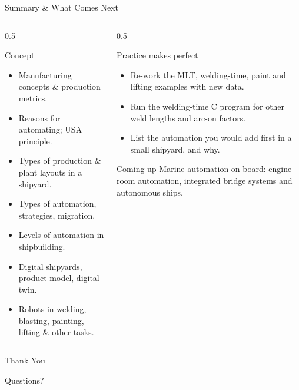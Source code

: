 \documentclass[aspectratio=169]{beamer}
\begin{document}
	\begin{frame}{Summary \& What Comes Next}
		\begin{columns}[T]
			\begin{column}{0.5\textwidth}
				\begin{block}{Concept}
					\begin{itemize}\small
						\item Manufacturing concepts \& production metrics.
						\item Reasons for automating; USA principle.
						\item Types of production \& plant layouts in a shipyard.
						\item Types of automation, strategies, migration.
						\item Levels of automation in shipbuilding.
						\item Digital shipyards, product model, digital twin.
						\item Robots in welding, blasting, painting, lifting \& other tasks.
					\end{itemize}
				\end{block}
			\end{column}
			\begin{column}{0.5\textwidth}
				\begin{block}{Practice makes perfect}
					\begin{itemize}\small
						\item Re-work the MLT, welding-time, paint and lifting examples with new data.
						\item Run the welding-time C program for other weld lengths and arc-on factors.
						\item List the automation you would add first in a small shipyard, and why.
					\end{itemize}
				\end{block}
				\begin{block}{Coming up}
					\small Marine automation on board: engine-room automation, integrated bridge systems and autonomous ships.
				\end{block}
			\end{column}
		\end{columns}
	\end{frame}

	\begin{frame}
		\centering
		\Huge Thank You
		\vspace{0.5cm}

		\normalsize Questions?
	\end{frame}

\end{document}
